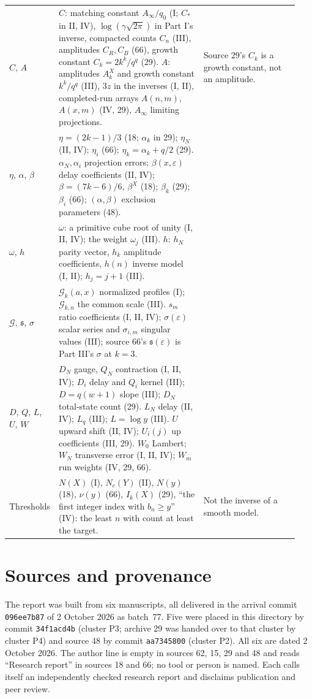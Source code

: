 \documentclass[11pt,letterpaper]{article}
\numberwithin{equation}{section}
\theoremstyle{remark}
\newcommand{\eps}{\varepsilon}
\newcommand{\G}{\mathcal G}
\begin{document}
{\begin{longtable}{@{}>{\raggedright\arraybackslash}p{0.11\linewidth}>{\raggedright\arraybackslash}p{0.5\linewidth}>{\raggedright\arraybackslash}p{0.33\linewidth}@{}}
$C$, $A$ & $C$: matching constant $A_\infty/q_0$ (I; $C_*$ in II, IV), $\log(\gamma\sqrt{2\pi})$ in Part I's inverse, compacted counts $C_n$ (III), amplitudes $C_R,C_B$ (66), growth constant $C_k=2k^k/q^q$ (29). $A$: amplitudes $A_k^X$ and growth constant $k^k/q^q$ (III), $3z$ in the inverses (I, II), completed-run arrays $A(n,m)$, $A(x,m)$ (IV, 29), $A_\infty$ limiting projections. & Source 29's $C_k$ is a growth constant, not an amplitude.\\
$\eta$, $\alpha$, $\beta$ & $\eta=(2k-1)/3$ (18; $\alpha_k$ in 29); $\eta_N$ (II, IV); $\eta_i$ (66); $\eta_k=\alpha_k+q/2$ (29). $\alpha_N,\alpha_i$ projection errors; $\beta(x,\eps)$ delay coefficients (II, IV); $\beta=(7k-6)/6$, $\beta^X$ (18); $\beta_k$ (29); $\beta_i$ (66); $(\alpha,\beta)$ exclusion parameters (48). & \\
$\omega$, $h$ & $\omega$: a primitive cube root of unity (I, II, IV); the weight $\omega_j$ (III). $h$: $h_N$ parity vector, $h_k$ amplitude coefficients, $h(n)$ inverse model (I, II); $h_j=j+1$ (III). & \\
$\G$, $\mathfrak s$, $\sigma$ & $\mathcal G_k(a,x)$ normalized profiles (I); $\G_{k,n}$ the common scale (III). $s_m$ ratio coefficients (I, II, IV); $\sigma(\eps)$ scalar series and $\sigma_{i,m}$ singular values (III); source 66's $\mathfrak s(\eps)$ is Part III's $\sigma$ at $k=3$. & \\
$D$, $Q$, $L$, $U$, $W$ & $D_N$ gauge, $Q_N$ contraction (I, II, IV); $D_i$ delay and $Q_i$ kernel (III); $D=q(w+1)$ slope (III); $D_N$ total-state count (29). $L_N$ delay (II, IV); $L_q$ (III); $L=\log y$ (III). $U$ upward shift (II, IV); $U_i(j)$ up coefficients (III, 29). $W_0$ Lambert; $W_N$ transverse error (I, II, IV); $W_m$ run weights (IV, 29, 66). & \\
Thresholds & $N(X)$ (I), $N_c(Y)$ (II), $N(y)$ (18), $\nu(y)$ (66), $I_k(X)$ (29), ``the first integer index with $b_n\ge y$'' (IV): the least $n$ with count at least the target. & Not the inverse of a smooth model.\\
\end{longtable}
}

\section*{Sources and provenance}
\label{air:guide:provenance}
The report was built from six manuscripts, all delivered in the arrival commit \texttt{096ee7b87} of 2 October 2026 as batch~77. Five were placed in this directory by commit \texttt{34f1acd4b} (cluster P3; archive 29 was handed over to that cluster by cluster P4) and source 48 by commit \texttt{aa7345800} (cluster P2). All six are dated 2 October 2026. The author line is empty in sources 62, 15, 29 and 48 and reads ``Research report'' in sources 18 and 66; no tool or person is named. Each calls itself an independently checked research report and disclaims publication and peer review.
\end{document}
